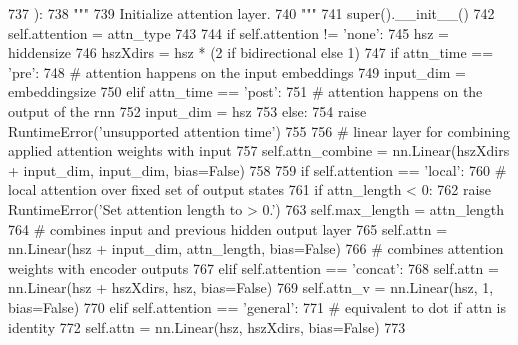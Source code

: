 \begin{DoxyCode}
737     ):
738         \textcolor{stringliteral}{"""}
739 \textcolor{stringliteral}{        Initialize attention layer.}
740 \textcolor{stringliteral}{        """}
741         super().\_\_init\_\_()
742         self.attention = attn\_type
743 
744         \textcolor{keywordflow}{if} self.attention != \textcolor{stringliteral}{'none'}:
745             hsz = hiddensize
746             hszXdirs = hsz * (2 \textcolor{keywordflow}{if} bidirectional \textcolor{keywordflow}{else} 1)
747             \textcolor{keywordflow}{if} attn\_time == \textcolor{stringliteral}{'pre'}:
748                 \textcolor{comment}{# attention happens on the input embeddings}
749                 input\_dim = embeddingsize
750             \textcolor{keywordflow}{elif} attn\_time == \textcolor{stringliteral}{'post'}:
751                 \textcolor{comment}{# attention happens on the output of the rnn}
752                 input\_dim = hsz
753             \textcolor{keywordflow}{else}:
754                 \textcolor{keywordflow}{raise} RuntimeError(\textcolor{stringliteral}{'unsupported attention time'})
755 
756             \textcolor{comment}{# linear layer for combining applied attention weights with input}
757             self.attn\_combine = nn.Linear(hszXdirs + input\_dim, input\_dim, bias=\textcolor{keyword}{False})
758 
759             \textcolor{keywordflow}{if} self.attention == \textcolor{stringliteral}{'local'}:
760                 \textcolor{comment}{# local attention over fixed set of output states}
761                 \textcolor{keywordflow}{if} attn\_length < 0:
762                     \textcolor{keywordflow}{raise} RuntimeError(\textcolor{stringliteral}{'Set attention length to > 0.'})
763                 self.max\_length = attn\_length
764                 \textcolor{comment}{# combines input and previous hidden output layer}
765                 self.attn = nn.Linear(hsz + input\_dim, attn\_length, bias=\textcolor{keyword}{False})
766                 \textcolor{comment}{# combines attention weights with encoder outputs}
767             \textcolor{keywordflow}{elif} self.attention == \textcolor{stringliteral}{'concat'}:
768                 self.attn = nn.Linear(hsz + hszXdirs, hsz, bias=\textcolor{keyword}{False})
769                 self.attn\_v = nn.Linear(hsz, 1, bias=\textcolor{keyword}{False})
770             \textcolor{keywordflow}{elif} self.attention == \textcolor{stringliteral}{'general'}:
771                 \textcolor{comment}{# equivalent to dot if attn is identity}
772                 self.attn = nn.Linear(hsz, hszXdirs, bias=\textcolor{keyword}{False})
773 
\end{DoxyCode}



